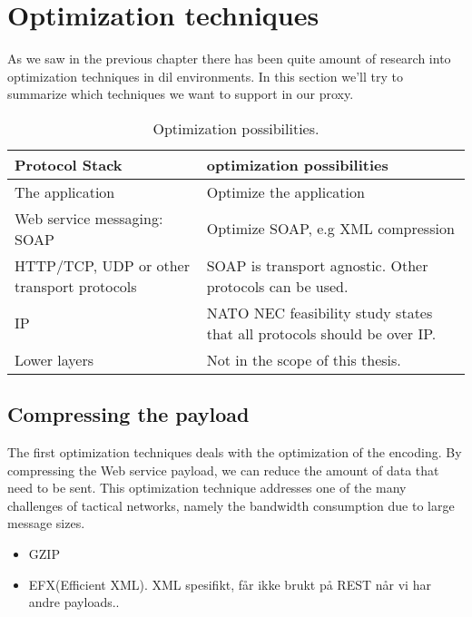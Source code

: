 \section{Optimization techniques}

As we saw in the previous chapter there has been quite amount of research into
optimization techniques in \gls{dil} environments. In this section we'll try to
summarize which techniques we want to support in our proxy.


\begin{table}[h]
\begin{tabularx}{\textwidth}{| X | X |}
\hline
  \textbf{Protocol Stack} & \textbf{optimization possibilities} \\ \hline
  The application & Optimize the application\\ \hline
  Web service messaging: SOAP & Optimize SOAP, e.g XML compression \\ \hline
  HTTP/TCP, UDP or other transport protocols & SOAP is transport agnostic. Other
  protocols can be used. \\ \hline
  IP & NATO NEC feasibility study states that all protocols should be over IP. \\
  \hline
  Lower layers & Not in the scope of this thesis. \\ \hline
\end{tabularx}
\caption{Optimization possibilities.} \label{table:optimalization-overview}
\end{table}


\subsection{Compressing the payload}

The first optimization techniques deals with the optimization of the encoding.
By compressing the Web service payload, we can reduce the amount of data that
need to be sent. This optimization technique addresses one of the many
challenges of tactical networks, namely the bandwidth consumption due to large
message sizes.

\begin{itemize}
\item GZIP

\item EFX(Efficient XML). XML spesifikt, får ikke brukt på REST når vi har andre
payloads..

\end{itemize}

